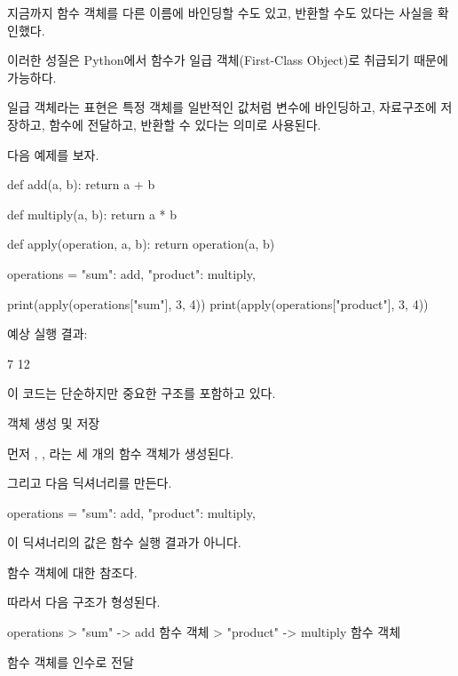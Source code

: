 지금까지 함수 객체를 다른 이름에 바인딩할 수도 있고, 반환할 수도 있다는 사실을 확인했다.

이러한 성질은 Python에서 함수가 일급 객체(First-Class Object)로 취급되기 때문에 가능하다.

일급 객체라는 표현은 특정 객체를 일반적인 값처럼 변수에 바인딩하고, 자료구조에 저장하고, 함수에 전달하고, 반환할 수 있다는 의미로 사용된다.

다음 예제를 보자.

\begin{dhkcode}
def add(a, b):
    return a + b

def multiply(a, b):
    return a * b

def apply(operation, a, b):
    return operation(a, b)

operations = {
    "sum": add,
    "product": multiply,
}

print(apply(operations["sum"], 3, 4))
print(apply(operations["product"], 3, 4))
\end{dhkcode}

예상 실행 결과:

\begin{dhkzsh}
7
12
\end{dhkzsh}

이 코드는 단순하지만 중요한 구조를 포함하고 있다.

\begin{dhknote}
\begin{dhksmry}[centered]
객체 생성 및 저장
\end{dhksmry}
\end{dhknote}

먼저 , , 라는 세 개의 함수 객체가 생성된다.

그리고 다음 딕셔너리를 만든다.

\begin{dhkcode}
operations = {
    "sum": add,
    "product": multiply,
}
\end{dhkcode}

이 딕셔너리의 값은 함수 실행 결과가 아니다.

함수 객체에 대한 참조다.

따라서 다음 구조가 형성된다.

\begin{dhkdir}[in=6]
operations
> "sum" -> add 함수 객체
> "product" -> multiply 함수 객체
\end{dhkdir}

\begin{dhknote}
\begin{dhksmry}[centered]
함수 객체를 인수로 전달
\end{dhksmry}
\end{dhknote}

